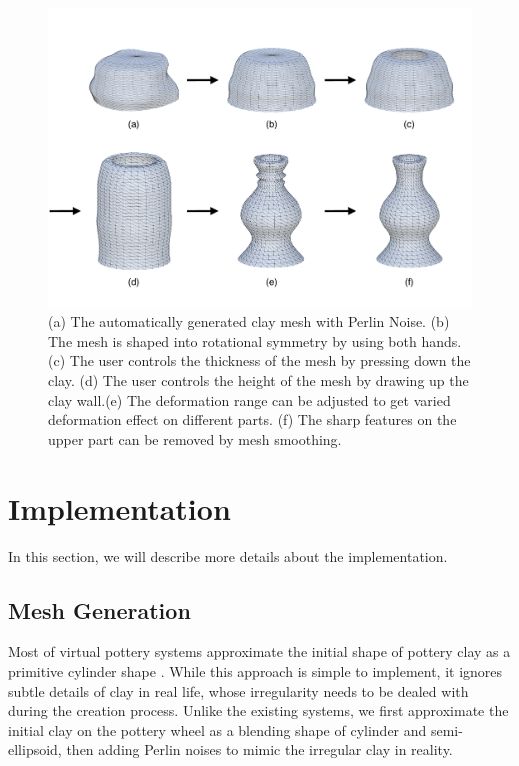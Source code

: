 \begin{figure}
\includegraphics[width=\textwidth]{fig2.pdf}
\caption{(a) The automatically generated clay mesh with Perlin Noise. (b) The mesh is shaped into rotational symmetry by using both hands. (c) The user controls the thickness of the mesh by pressing down the clay. (d) The user controls the height of the mesh by drawing up the clay wall.(e) The deformation range can be adjusted to get varied deformation effect on different parts. (f) The sharp features on the upper part can be removed by mesh smoothing.}
\label{fig:2}
\end{figure}

\section{Implementation}
\label{sec:4}

In this section, we will describe more details about the implementation. 

\subsection{Mesh Generation}
\label{sec:4.1}

Most of virtual pottery systems approximate the initial shape of pottery clay as a primitive cylinder shape \cite{han2007ar,ramani2015gesture,Vinayak2016Extracting}. While this approach is simple to implement, it ignores subtle details of clay in real life, whose irregularity needs to be dealed with during the creation process. Unlike the existing systems, we first approximate the initial clay on the pottery wheel as a blending shape of cylinder and semi-ellipsoid, then adding Perlin noises to mimic the irregular clay in reality.

